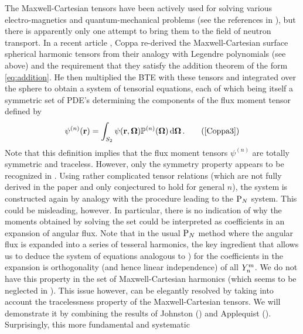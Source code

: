 The Maxwell-Cartesian tensors have been actively used for solving various electro-magnetics and quantum-mechanical
problems (see the references in \cite{Applequist2}), but there is apparently only one attempt to bring them to the field
of neutron transport. In a recent article \cite{Coppa3}, Coppa re-derived the Maxwell-Cartesian surface spherical
harmonic tensors from their analogy with Legendre polynomials (see above) and the requirement that they satisfy the
addition theorem of the form \eqref{eq:addition}. He then multiplied the BTE with these tensors and integrated over the
sphere to obtain a system of tensorial equations, each of which being itself a symmetric set of PDE's determining the
components of the flux moment tensor defined by
\begin{equation*}
  \psi^{(n)}(\br) = \intA{\psi(\br,\bomega)\PP[n](\bomega)}.\tag{\cite[Eqn. (42)]{Coppa3}}
\end{equation*}
Note that this definition implies that the flux moment tensors $\psi^{(n)}$ are totally symmetric and traceless. 
However, only the symmetry property appears to be recognized in \cite{Coppa3}. Using rather complicated tensor relations 
(which are not fully derived in the paper and only conjectured to hold for general $n$), the system is constructed again 
by analogy with the procedure leading to the $\text{P}_{N}$ system. This could be misleading, however. In particular, there is 
no indication of why the moments obtained by solving the set could be interpreted as coefficients in an expansion of 
angular flux. Note that in the usual $\text{P}_{N}$ method where the angular flux is expanded into a series of tesseral 
harmonics, the key ingredient that allows us to deduce 
the system of equations analogous to \cite[Eqn. (48)]{Coppa3}) for the coefficients in the expansion is orthogonality 
(and hence linear independence) of all $Y_{n}^{m}$. We do not have this property in the set of Maxwell-Cartesian 
harmonics (which seems to be neglected in \cite{Coppa3}). This issue however, can be elegantly resolved by taking into 
account the tracelessness property of the Maxwell-Cartesian tensors. We will demonstrate it by combining the results of 
Johnston (\cite{Johnston1}) and Applequist (\cite{Applequist1}). Surprisingly, this more fundamental and systematic 
